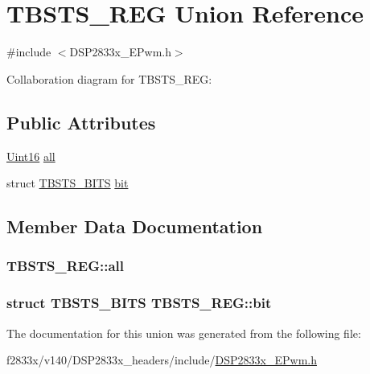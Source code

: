 \hypertarget{union_t_b_s_t_s___r_e_g}{}\section{T\+B\+S\+T\+S\+\_\+\+R\+E\+G Union Reference}
\label{union_t_b_s_t_s___r_e_g}


{\ttfamily \#include $<$D\+S\+P2833x\+\_\+\+E\+Pwm.\+h$>$}



Collaboration diagram for T\+B\+S\+T\+S\+\_\+\+R\+E\+G\+:
\subsection*{Public Attributes}
\begin{DoxyCompactItemize}
\item 
\hyperlink{_d_s_p2833x___device_8h_a59a9f6be4562c327cbfb4f7e8e18f08b}{Uint16} \hyperlink{union_t_b_s_t_s___r_e_g_aaf971464c815c857aaca768ee7564388}{all}
\item 
struct \hyperlink{struct_t_b_s_t_s___b_i_t_s}{T\+B\+S\+T\+S\+\_\+\+B\+I\+T\+S} \hyperlink{union_t_b_s_t_s___r_e_g_ab0c63b7a9adfd63ae0df0fee80174a66}{bit}
\end{DoxyCompactItemize}


\subsection{Member Data Documentation}
\hypertarget{union_t_b_s_t_s___r_e_g_aaf971464c815c857aaca768ee7564388}{}
\subsubsection[{all}]{ T\+B\+S\+T\+S\+\_\+\+R\+E\+G\+::all}\label{union_t_b_s_t_s___r_e_g_aaf971464c815c857aaca768ee7564388}
\hypertarget{union_t_b_s_t_s___r_e_g_ab0c63b7a9adfd63ae0df0fee80174a66}{}
\subsubsection[{bit}]{\setlength{\rightskip}{0pt plus 5cm}struct {\bf T\+B\+S\+T\+S\+\_\+\+B\+I\+T\+S} T\+B\+S\+T\+S\+\_\+\+R\+E\+G\+::bit}\label{union_t_b_s_t_s___r_e_g_ab0c63b7a9adfd63ae0df0fee80174a66}


The documentation for this union was generated from the following file\+:\begin{DoxyCompactItemize}
\item 
f2833x/v140/\+D\+S\+P2833x\+\_\+headers/include/\hyperlink{_d_s_p2833x___e_pwm_8h}{D\+S\+P2833x\+\_\+\+E\+Pwm.\+h}\end{DoxyCompactItemize}
